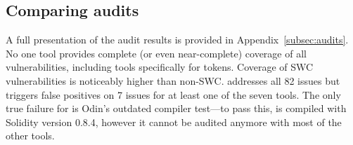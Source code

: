 
\subsection{Comparing audits}

A full presentation of the audit results is provided in Appendix~\ref{subsec:audits}. No one tool provides complete (or even near-complete) coverage of all vulnerabilities, including tools specifically for tokens. Coverage of SWC vulnerabilities is noticeably higher than non-SWC. \sys addresses all 82 issues but triggers false positives on 7 issues for at least one of the seven tools. The only true failure for \sys is Odin's outdated compiler test---to pass this, \sys is compiled with Solidity version 0.8.4, however it cannot be audited anymore with most of the other tools.



%

